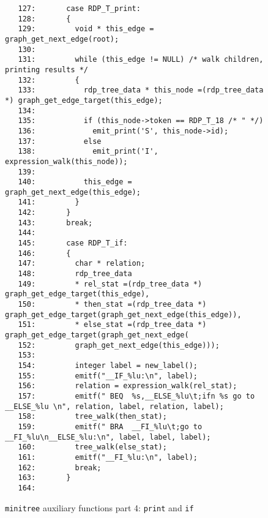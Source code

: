 \begin{figure}
\hspace*{-2.5cm}
\footnotesize
\begin{minipage}{30cm}
\begin{verbatim}
   127:       case RDP_T_print: 
   128:       {
   129:         void * this_edge = graph_get_next_edge(root); 
   130:         
   131:         while (this_edge != NULL) /* walk children, printing results */
   132:         {
   133:           rdp_tree_data * this_node =(rdp_tree_data *) graph_get_edge_target(this_edge); 
   134:           
   135:           if (this_node->token == RDP_T_18 /* " */)
   136:             emit_print('S', this_node->id); 
   137:           else
   138:             emit_print('I', expression_walk(this_node)); 
   139:           
   140:           this_edge = graph_get_next_edge(this_edge); 
   141:         }
   142:       }
   143:       break; 
   144:       
   145:       case RDP_T_if: 
   146:       {
   147:         char * relation; 
   148:         rdp_tree_data
   149:         * rel_stat =(rdp_tree_data *) graph_get_edge_target(this_edge), 
   150:         * then_stat =(rdp_tree_data *) graph_get_edge_target(graph_get_next_edge(this_edge)), 
   151:         * else_stat =(rdp_tree_data *) graph_get_edge_target(graph_get_next_edge(
   152:         graph_get_next_edge(this_edge))); 
   153:         
   154:         integer label = new_label(); 
   155:         emitf("__IF_%lu:\n", label); 
   156:         relation = expression_walk(rel_stat); 
   157:         emitf(" BEQ  %s,__ELSE_%lu\t;ifn %s go to __ELSE_%lu \n", relation, label, relation, label); 
   158:         tree_walk(then_stat); 
   159:         emitf(" BRA  __FI_%lu\t;go to __FI_%lu\n__ELSE_%lu:\n", label, label, label); 
   160:         tree_walk(else_stat); 
   161:         emitf("__FI_%lu:\n", label); 
   162:         break; 
   163:       }
   164:       
\end{verbatim}
\end{minipage}
\caption{{\tt minitree} auxiliary functions part 4: {\tt print} and {\tt if}}
\label{mt_aux.c:4}
\end{figure}
